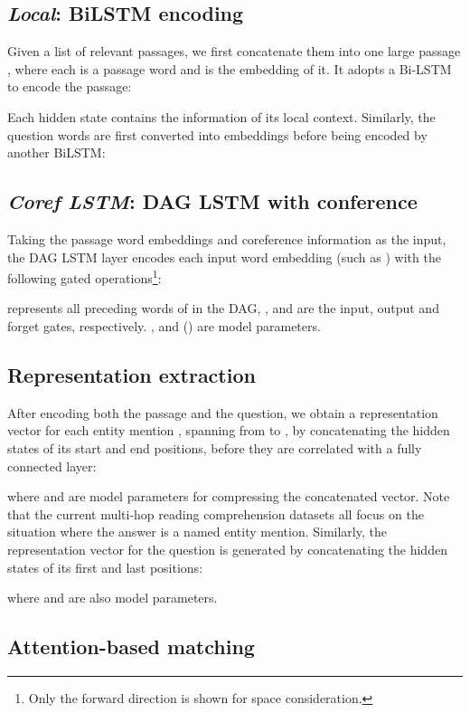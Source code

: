 \documentclass[letterpaper]{article}
\begin{document}
\subsection{\emph{Local}: BiLSTM encoding}

Given a list of relevant passages, we first concatenate them into one large passage , where each  is a passage word and  is the embedding of it.
It adopts a Bi-LSTM to encode the passage:

Each hidden state contains the information of its local context.
Similarly, the question words  are first converted into embeddings  before being encoded by another BiLSTM:


\subsection{\emph{Coref LSTM}: DAG LSTM with conference}

Taking the passage word embeddings  and coreference information as the input, 
the DAG LSTM layer encodes each input word embedding (such as ) with the following gated operations\footnote{Only the forward direction is shown for space consideration.}:

 represents all preceding words of  in the DAG, ,  and  are the input, output and forget gates, respectively. ,  and  () are model parameters.

\subsection{Representation extraction}



After encoding both the passage and the question, we obtain a representation vector for each entity mention , spanning from  to , by concatenating the hidden states of its start and end positions, before they are correlated with a fully connected layer:

where  and  are model parameters for compressing the concatenated vector.
Note that the current multi-hop reading comprehension datasets all focus on the situation where the answer is a named entity mention.
Similarly, the representation vector for the question is generated by concatenating the hidden states of its first and last positions:

where  and  are also model parameters.


\subsection{Attention-based matching}
\end{document}
